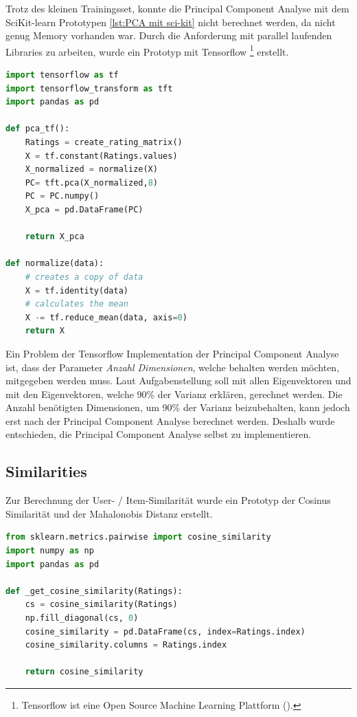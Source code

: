 \noindent Trotz des kleinen Trainingsset, konnte die Principal Component Analyse mit dem SciKit-learn Prototypen \ref{lst:PCA mit sci-kit} nicht berechnet werden, da nicht genug Memory vorhanden war. Durch die Anforderung mit parallel laufenden Libraries zu arbeiten, wurde ein Prototyp mit Tensorflow \footnote{Tensorflow ist eine Open Source Machine Learning Plattform (\cite{tensorflow2015-whitepaper}).} erstellt.


\begin{lstlisting}[language=Python, caption= Principal Component Analyse mit Tensorflow, label=lst:PCA mit Tensorflow]
import tensorflow as tf
import tensorflow_transform as tft
import pandas as pd

def pca_tf():
    Ratings = create_rating_matrix()
    X = tf.constant(Ratings.values)
    X_normalized = normalize(X)
    PC= tft.pca(X_normalized,8)
    PC = PC.numpy()
    X_pca = pd.DataFrame(PC)
    
    return X_pca
    
def normalize(data):
    # creates a copy of data
    X = tf.identity(data)
    # calculates the mean
    X -= tf.reduce_mean(data, axis=0)
    return X

\end{lstlisting}

Ein Problem der Tensorflow Implementation der Principal Component Analyse ist, dass der Parameter \textit{Anzahl Dimensionen}, welche behalten werden möchten, mitgegeben werden muss. Laut Aufgabenstellung soll mit allen Eigenvektoren und mit den Eigenvektoren, welche 90\% der Varianz erklären, gerechnet werden. Die Anzahl benötigten Dimensionen, um 90\% der Varianz beizubehalten, kann jedoch erst nach der Principal Component Analyse berechnet werden. Deshalb wurde entschieden, die Principal Component Analyse selbst zu implementieren.

\subsection{Similarities}
Zur Berechnung der User- / Item-Similarität wurde ein Prototyp der Cosinus Similarität und der Mahalonobis Distanz erstellt.

\begin{lstlisting}[language=Python, caption= Cosinus Similarität, label=lst:Cosinus Similarität]
from sklearn.metrics.pairwise import cosine_similarity
import numpy as np
import pandas as pd

def _get_cosine_similarity(Ratings):
    cs = cosine_similarity(Ratings)
    np.fill_diagonal(cs, 0)
    cosine_similarity = pd.DataFrame(cs, index=Ratings.index)
    cosine_similarity.columns = Ratings.index
    
    return cosine_similarity

\end{lstlisting}


